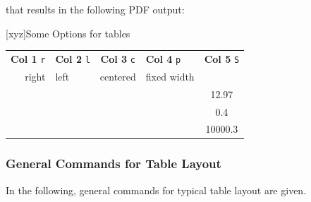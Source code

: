that results in the following PDF output:
\begin{minipage}{\linewidth}
   [xyz]{Some Options for tables}\label{tab:TabGenLayout}
   \begin{tabular}{rlcp{10mm}S}\toprule
      \textbf{Col 1} \texttt{r} & \textbf{ Col 2} \texttt{l} & \textbf{Col 3} \texttt{c} & \textbf{Col 4}
      \texttt{p} & \textbf{ Col 5} \texttt{S} \\ \cmidrule(lr){1-4}
      right & left & centered & fixed width &  \\ \midrule
      & & & & 12.97 \\
      & & & & 0.4 \\
      & & & & 10000.3 \\ \bottomrule
   \end{tabular}%
\end{minipage}

\bigskip

\subsubsection{General Commands for Table Layout}
In the following, general commands for typical table layout are given.

